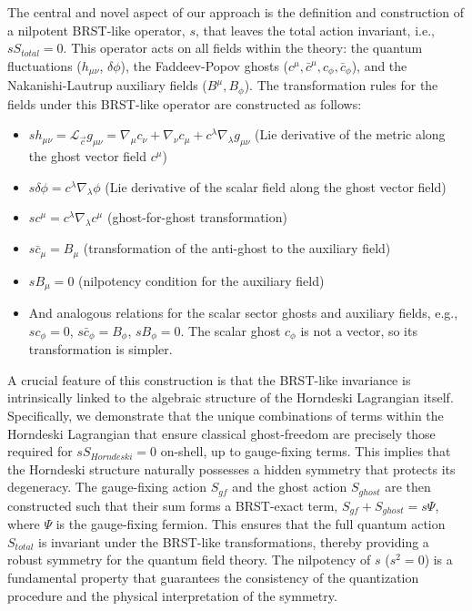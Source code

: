 \documentclass[twocolumn]{aastex631}
\begin{document}
The central and novel aspect of our approach is the definition and construction of a nilpotent BRST-like operator, $s$, that leaves the total action invariant, i.e., $s S_{total} = 0$. This operator acts on all fields within the theory: the quantum fluctuations ($h_{\mu\nu}$, $\delta\phi$), the Faddeev-Popov ghosts ($c^\mu, \bar{c}^\mu, c_\phi, \bar{c}_\phi$), and the Nakanishi-Lautrup auxiliary fields ($B^\mu, B_\phi$). The transformation rules for the fields under this BRST-like operator are constructed as follows:
\begin{itemize}
    \item $s h_{\mu\nu} = \mathcal{L}_{\vec{c}} g_{\mu\nu} = \nabla_\mu c_\nu + \nabla_\nu c_\mu + c^\lambda \nabla_\lambda g_{\mu\nu}$ (Lie derivative of the metric along the ghost vector field $c^\mu$)
    \item $s \delta\phi = c^\lambda \nabla_\lambda \phi$ (Lie derivative of the scalar field along the ghost vector field)
    \item $s c^\mu = c^\lambda \nabla_\lambda c^\mu$ (ghost-for-ghost transformation)
    \item $s \bar{c}_\mu = B_\mu$ (transformation of the anti-ghost to the auxiliary field)
    \item $s B_\mu = 0$ (nilpotency condition for the auxiliary field)
    \item And analogous relations for the scalar sector ghosts and auxiliary fields, e.g., $s c_\phi = 0$, $s \bar{c}_\phi = B_\phi$, $s B_\phi = 0$. The scalar ghost $c_\phi$ is not a vector, so its transformation is simpler.
\end{itemize}
A crucial feature of this construction is that the BRST-like invariance is intrinsically linked to the algebraic structure of the Horndeski Lagrangian itself. Specifically, we demonstrate that the unique combinations of terms within the Horndeski Lagrangian that ensure classical ghost-freedom are precisely those required for $s S_{Horndeski} = 0$ on-shell, up to gauge-fixing terms. This implies that the Horndeski structure naturally possesses a hidden symmetry that protects its degeneracy. The gauge-fixing action $S_{gf}$ and the ghost action $S_{ghost}$ are then constructed such that their sum forms a BRST-exact term, $S_{gf} + S_{ghost} = s\Psi$, where $\Psi$ is the gauge-fixing fermion. This ensures that the full quantum action $S_{total}$ is invariant under the BRST-like transformations, thereby providing a robust symmetry for the quantum field theory. The nilpotency of $s$ ($s^2=0$) is a fundamental property that guarantees the consistency of the quantization procedure and the physical interpretation of the symmetry.
\end{document}
